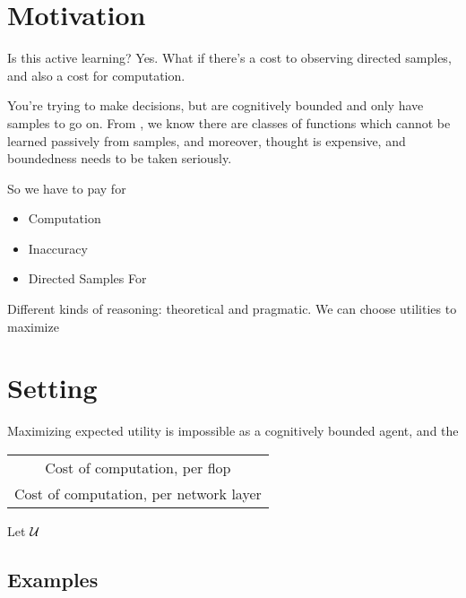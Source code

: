 \documentclass{article}
\begin{document}
	\section{Motivation}
	Is this active learning? Yes. What if there's a cost to observing directed samples, and also a cost for computation.
	
	You're trying to make decisions, but are cognitively bounded and only have samples to go on. From \cite{opt-from-samples}, we know there are classes of functions which cannot be learned passively from samples, and moreover, thought is expensive, and boundedness needs to be taken seriously. %
	
	So we have to pay for
	\begin{itemize}
		\item Computation
		\item Inaccuracy
		\item Directed Samples
		For 
	\end{itemize}


	Different kinds of reasoning: theoretical and pragmatic. We can choose utilities to maximize 
	
	\section{Setting}
	Maximizing expected utility is impossible as a cognitively bounded agent, and the
	

	
	\begin{center}
		\begin{tabular}{c}
			Cost of computation, per flop \\
			Cost of computation, per network layer \\
			
		\end{tabular}
	\end{center}
	
	Let $\cal U$
	
	\subsection{Examples}
	
%	
	
	
\end{document}
